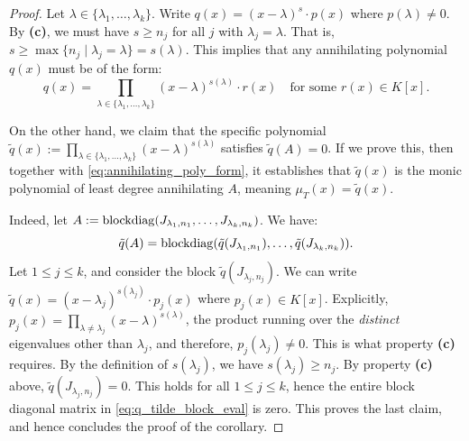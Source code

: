\begin{proof}
Let $\lambda \in \{ \lambda_1, \dots, \lambda_k \}$. Write $q(x) = (x-\lambda)^s \cdot p(x)$ where $p(\lambda) \neq 0$. By \textbf{(c)}, we must have $s \ge n_j$ for all $j$ with $\lambda_j = \lambda$. That is, $s \ge \max \{ n_j \mid \lambda_j = \lambda \} = s(\lambda)$.
This implies that any annihilating polynomial $q(x)$ must be of the form:
\begin{equation}
\label{eq:annihilating_poly_form}
q(x) = \prod_{\lambda \in \{\lambda_1, \dots, \lambda_k\}} (x-\lambda)^{s(\lambda)} \cdot r(x) \quad \text{for some } r(x) \in K[x].
\end{equation}

On the other hand, we claim that the specific polynomial $\tilde{q}(x) := \prod_{\lambda \in \{\lambda_1, \dots, \lambda_k\}} (x-\lambda)^{s(\lambda)}$ satisfies $\tilde{q}(A) = 0$. If we prove this, then together with \eqref{eq:annihilating_poly_form}, it establishes that $\tilde{q}(x)$ is the monic polynomial of least degree annihilating $A$, meaning $\mu_T(x) = \tilde{q}(x)$.

Indeed, let $A := \operatorname{blockdiag}(J_{\lambda_1, n_1}, \dots, J_{\lambda_k, n_k})$. We have:
\begin{equation}
\label{eq:q_tilde_block_eval}
\tilde{q}(A) = \operatorname{blockdiag}(\tilde{q}(J_{\lambda_1, n_1}), \dots, \tilde{q}(J_{\lambda_k, n_k})).
\end{equation}
Let $1 \le j \le k$, and consider the block $\tilde{q}(J_{\lambda_j, n_j})$. We can write $\tilde{q}(x) = (x-\lambda_j)^{s(\lambda_j)} \cdot p_j(x)$ where $p_j(x) \in K[x]$.
Explicitly, $p_j(x) = \prod_{\lambda \neq \lambda_j} (x-\lambda)^{s(\lambda)}$, the product running over the \emph{distinct} eigenvalues other than $\lambda_j$, and therefore, $p_j(\lambda_j) \neq 0$. This is what property \textbf{(c)} requires.
By the definition of $s(\lambda_j)$, we have $s(\lambda_j) \ge n_j$. By property \textbf{(c)} above, $\tilde{q}(J_{\lambda_j, n_j}) = 0$. This holds for all $1 \le j \le k$, hence the entire block diagonal matrix in \eqref{eq:q_tilde_block_eval} is zero. This proves the last claim, and hence concludes the proof of the corollary.
\end{proof}

